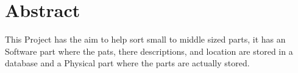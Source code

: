 \chapter*{Abstract}
This Project has the aim to help sort small to middle sized parts, it has an Software part where the pats, there descriptions, and location are stored in a database and a Physical part where the parts are actually stored.